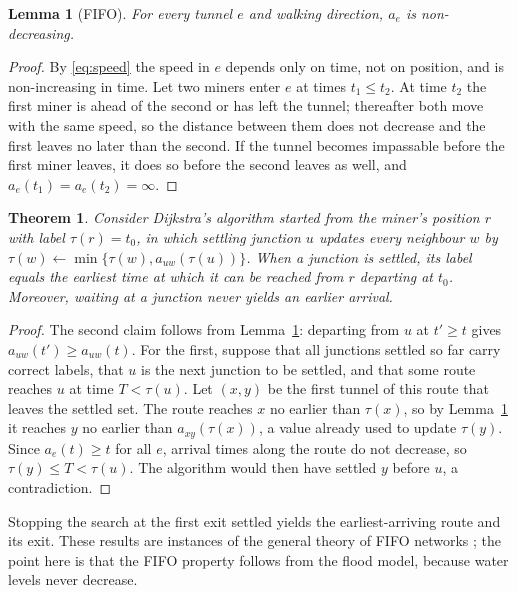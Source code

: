 \documentclass[11pt,a4paper]{article}
\theoremstyle{plain}
\newtheorem{lemma}{Lemma}
\newtheorem{theorem}{Theorem}
\theoremstyle{definition}
\theoremstyle{remark}
\begin{document}
\begin{lemma}[FIFO]\label{lem:fifo}
For every tunnel $e$ and walking direction, $a_e$ is non-decreasing.
\end{lemma}
\begin{proof}
By \eqref{eq:speed} the speed in $e$ depends only on time, not on position, and is non-increasing in time. Let two miners enter $e$ at times $t_1 \le t_2$. At time $t_2$ the first miner is ahead of the second or has left the tunnel; thereafter both move with the same speed, so the distance between them does not decrease and the first leaves no later than the second. If the tunnel becomes impassable before the first miner leaves, it does so before the second leaves as well, and $a_e(t_1) = a_e(t_2) = \infty$.
\end{proof}

\begin{theorem}\label{thm:dijkstra}
Consider Dijkstra's algorithm \cite{dijkstra} started from the miner's position $r$ with label $\tau(r) = t_0$, in which settling junction $u$ updates every neighbour $w$ by $\tau(w) \gets \min\{\tau(w), a_{uw}(\tau(u))\}$. When a junction is settled, its label equals the earliest time at which it can be reached from $r$ departing at $t_0$. Moreover, waiting at a junction never yields an earlier arrival.
\end{theorem}
\begin{proof}
The second claim follows from Lemma~\ref{lem:fifo}: departing from $u$ at $t' \ge t$ gives $a_{uw}(t') \ge a_{uw}(t)$. For the first, suppose that all junctions settled so far carry correct labels, that $u$ is the next junction to be settled, and that some route reaches $u$ at time $T < \tau(u)$. Let $(x, y)$ be the first tunnel of this route that leaves the settled set. The route reaches $x$ no earlier than $\tau(x)$, so by Lemma~\ref{lem:fifo} it reaches $y$ no earlier than $a_{xy}(\tau(x))$, a value already used to update $\tau(y)$. Since $a_e(t) \ge t$ for all $e$, arrival times along the route do not decrease, so $\tau(y) \le T < \tau(u)$. The algorithm would then have settled $y$ before $u$, a contradiction.
\end{proof}

Stopping the search at the first exit settled yields the earliest-arriving route and its exit. These results are instances of the general theory of FIFO networks \cite{kaufman, orda}; the point here is that the FIFO property follows from the flood model, because water levels never decrease.
\end{document}
